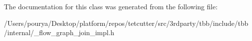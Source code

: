 The documentation for this class was generated from the following file\+:\begin{DoxyCompactItemize}
\item 
/\+Users/pourya/\+Desktop/platform/repos/tetcutter/src/3rdparty/tbb/include/tbb/internal/\+\_\+flow\+\_\+graph\+\_\+join\+\_\+impl.\+h\end{DoxyCompactItemize}
